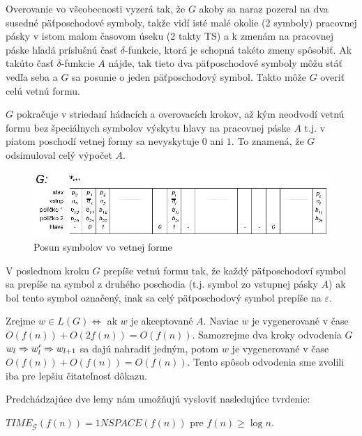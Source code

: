 \begin{dokaz}
  Overovanie vo všeobecnosti vyzerá tak, že $G$ akoby sa naraz
  pozeral na dva susedné päťposchodové symboly, takže vidí isté malé
  okolie (2 symboly) pracovnej pásky v istom malom časovom úseku (2
  takty TS) a k zmenám na pracovnej páske hľadá príslušnú časť
  $\delta$-funkcie, ktorá je schopná takéto zmeny spôsobiť. Ak
  takúto časť $\delta$-funkcie $A$ nájde, tak tieto dva
  päťposchodové symboly môžu stáť vedľa seba a $G$ sa posunie o
  jeden päťposchodový symbol. Takto môže $G$ overiť celú vetnú
  formu.

  $G$ pokračuje v striedaní hádacích a overovacích krokov, až kým
  neodvodí vetnú formu bez špeciálnych symbolov výskytu hlavy na
  pracovnej páske $A$ t.j. v piatom poschodí vetnej formy sa
  nevyskytuje $0$ ani $1$. To znamená, že $G$ odsimuloval celý
  výpočet $A$.

  \begin{figure}[!ht]
    \centering
    \includegraphics{img/gsystems/time_g2}
    \caption{Posun symbolov vo vetnej forme} \label{gs_obr_time_g2}
  \end{figure}

  V poslednom kroku $G$ prepíše vetnú formu tak, že každý
  päťposchodoví symbol sa prepíše na symbol z druhého poschodia
  (t.j. symbol zo vstupnej pásky $A$) ak bol tento symbol označený,
  inak sa celý päťposchodový symbol prepíše na $\varepsilon$.

  Zrejme $w\in L(G)\Longleftrightarrow$ ak $w$ je akceptované $A$.
  Naviac $w$ je vygenerované v čase\newline
  $O(f(n))+O(2f(n))=O(f(n))$. Samozrejme dva kroky odvodenia $G$
  $w_l\Rightarrow w_l'\Rightarrow w_{l+1}$ sa dajú nahradiť jedným, potom $w$ je
  vygenerované v čase $O(f(n))+O(f(n))=O(f(n))$. Tento spôsob
  odvodenia sme zvolili iba pre lepšiu čitateľnosť dôkazu.
\end{dokaz}

\medskip
Predchádzajúce dve lemy nám umožňujú vysloviť nasledujúce tvrdenie:

\begin{veta}
  $TIME_{\mathcal{G}}(f(n))=1NSPACE(f(n))$ pre $f(n)\geq\log n$.
\end{veta}

